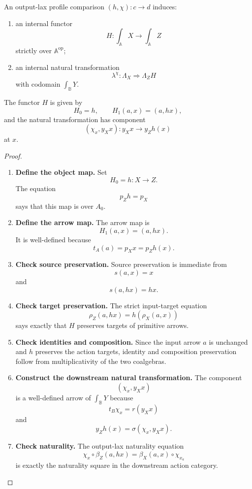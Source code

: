 \begin{proposition}
\label{prop:poly-relative-flatten-output-lax-profile-comparison}
An output-lax profile comparison \((h,\chi):c\to d\) induces:
\begin{enumerate}
\item an internal functor
\[
H:\int_{\mathbb A}X\to\int_{\mathbb A}Z
\]
strictly over \(\mathbb A^{\mathrm{op}}\);
\item an internal natural transformation
\[
\lambda^\chi:
\Lambda_X\Rightarrow\Lambda_ZH
\]
with codomain \(\int_{\mathbb B}Y\).
\end{enumerate}
The functor \(H\) is given by
\[
H_0=h,
\qquad
H_1(a,x)=(a,hx),
\]
and the natural transformation has component
\[
(\chi_x,y_Xx):y_Xx\to y_Zh(x)
\]
at \(x\).
\end{proposition}

\begin{proof}
\leavevmode
\begin{enumerate}
\item \textbf{Define the object map.}
Set
\[
H_0=h:X\to Z.
\]
The equation
\[
p_Zh=p_X
\]
says that this map is over \(A_0\).

\item \textbf{Define the arrow map.}
The arrow map is
\[
H_1(a,x)=(a,hx).
\]
It is well-defined because
\[
t_A(a)=p_Xx=p_Zh(x).
\]

\item \textbf{Check source preservation.}
Source preservation is immediate from
\[
s(a,x)=x
\]
and
\[
s(a,hx)=hx.
\]

\item \textbf{Check target preservation.}
The strict input-target equation
\[
\rho_Z(a,hx)=h(\rho_X(a,x))
\]
says exactly that \(H\) preserves targets of primitive arrows.

\item \textbf{Check identities and composition.}
Since the input arrow \(a\) is unchanged and \(h\) preserves the action targets,
identity and composition preservation follow from multiplicativity of the two
coalgebras.

\item \textbf{Construct the downstream natural transformation.}
The component
\[
(\chi_x,y_Xx)
\]
is a well-defined arrow of \(\int_{\mathbb B}Y\) because
\[
t_B\chi_x=r(y_Xx)
\]
and
\[
y_Zh(x)=\sigma(\chi_x,y_Xx).
\]

\item \textbf{Check naturality.}
The output-lax naturality equation
\[
\chi_x\circ \beta_Z(a,hx)
=
\beta_X(a,x)\circ \chi_{x_a}
\]
is exactly the naturality square in the downstream action category.
\end{enumerate}
\end{proof}

